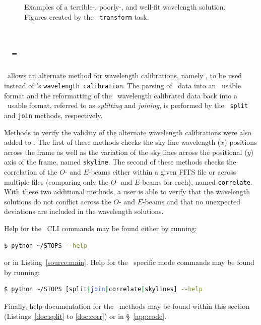 \begin{figure}[t]
    \centering
    \caption{Examples of a terrible-, poorly-, and well-fit wavelength solution. Figures created by the \iraf\ \texttt{transform} task.}
    \label{fig:iraf_tran_eg}
\end{figure}

\section[\stops]{\stops\ - } \label{sec:stops}

\stops\ allows an alternate method for wavelength calibrations, namely \iraf, to be used instead of \polsalt's \texttt{wavelength calibration}. The parsing of \polsalt\ data into an \iraf\ usable format and the reformatting of the \iraf\ wavelength calibrated data back into a \polsalt\ usable format, referred to as \textit{splitting} and \textit{joining}, is performed by the \stops\ \texttt{split} and \texttt{join} methods, respectively.

Methods to verify the validity of the alternate wavelength calibrations were also added to \stops. The first of these methods checks the sky line wavelength ($x$) positions across the frame as well as the variation of the sky lines across the positional ($y$) axis of the frame, named \texttt{skyline}. The second of these methods checks the correlation of the $O$- and $E$-beams either within a given \gls{FITS} file or across multiple files (comparing only the $O$- and $E$-beams for each), named \texttt{correlate}. With these two additional methods, a user is able to verify that the wavelength solutions do not conflict across the $O$- and $E$-beams and that no unexpected deviations are included in the wavelength solutions.

Help for the \stops\ \gls{CLI} commands may be found either by running:
\begin{lstlisting}[language=bash]
$ python ~/STOPS --help
\end{lstlisting}
{\parskip=0pt or} in Listing~\ref{source:main}.
Help for the \stops\ specific mode commands may be found by running:
\begin{lstlisting}[language=bash]
$ python ~/STOPS [split|join|correlate|skylines] --help
\end{lstlisting}
{\parskip=0pt Finally}, help documentation for the \stops\ methods may be found within this section (Listings~\ref{doc:split} to \ref{doc:corr}) or in \S~\ref{app:code}.

